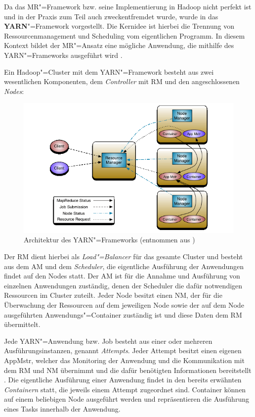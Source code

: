 Da das \ac{MR}"=Framework bzw. seine Implementierung in Hadoop nicht perfekt ist und in der Praxis zum Teil auch zweckentfremdet wurde, wurde in \cite{Vavilapalli2013} das \textbf{\ac{YARN}}"=Framework vorgestellt.
Die Kernidee ist hierbei die Trennung von Ressourcenmanagement und Scheduling vom eigentlichen Programm.
In diesem Kontext bildet der \ac{MR}"=Ansatz eine mögliche Anwendung, die mithilfe des \ac{YARN}"=Frameworks ausgeführt wird \cite{Vavilapalli2013}.

Ein Hadoop"=Cluster mit dem \ac{YARN}"=Framework besteht aus zwei wesentlichen Komponenten, dem \emph{Controller} mit \ac{RM} und den angeschlossenen \emph{Nodes}:

\begin{figure}[h]
    \includegraphics{./resources/yarn_architecture.png}
    \caption[Architektur des YARN"=Frameworks]
    {Architektur des \ac{YARN}"=Frameworks (entnommen aus \cite{HadoopYarnArch271})}
    \label{fig:yarnarch}
\end{figure}

Der \ac{RM} dient hierbei als \emph{Load"=Balancer} für das gesamte Cluster und besteht aus dem \ac{AM} und dem \emph{Scheduler}, die eigentliche Ausführung der Anwendungen findet auf den Nodes statt.
Der \ac{AM} ist für die Annahme und Ausführung von einzelnen Anwendungen zuständig, denen der Scheduler die dafür notwendigen Ressourcen im Cluster zuteilt.
Jeder Node besitzt einen \ac{NM}, der für die Überwachung der Ressourcen auf dem jeweiligen Node sowie der auf dem Node ausgeführten Anwendungs"=Container zuständig ist und diese Daten dem \ac{RM} übermittelt.

Jede \ac{YARN}"=Anwendung bzw. Job besteht aus einer oder mehreren Ausführungsinstanzen, genannt \emph{Attempts}.
Jeder Attempt besitzt einen eigenen \ac{AppMstr}, welcher das Monitoring der Anwendung und die Kommunikation mit dem \ac{RM} und \ac{NM} übernimmt und die dafür benötigten Informationen bereitstellt \cite{HadoopYarnArch271}.
Die eigentliche Ausführung einer Anwendung findet in den bereits erwähnten \emph{Containern} statt, die jeweils einem Attempt zugeordnet sind.
Container können auf einem beliebigen Node ausgeführt werden und repräsentieren die Ausführung eines Tasks innerhalb der Anwendung.

